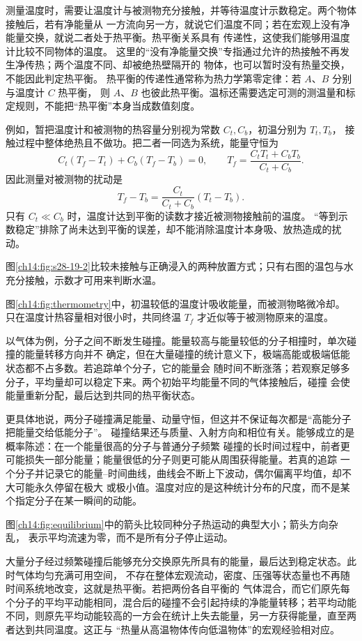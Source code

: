 {测量温度时，需要让温度计与被测物充分接触，并等待温度计示数稳定。两个物体接触后，若有净能量从
一方流向另一方，就说它们温度不同；若在宏观上没有净能量交换，就说二者处于热平衡。热平衡关系具有
传递性，这使我们能够用温度计比较不同物体的温度。
这里的“没有净能量交换”专指通过允许的热接触不再发生净传热；两个温度不同、却被绝热壁隔开的
物体，也可以暂时没有热量交换，不能因此判定热平衡。
热平衡的传递性通常称为热力学第零定律：若 $A$、$B$ 分别与温度计 $C$ 热平衡，
则 $A$、$B$ 也彼此热平衡。温标还需要选定可测的测温量和标定规则，不能把“热平衡”本身当成数值刻度。

例如，暂把温度计和被测物的热容量分别视为常数 $C_t,C_b$，初温分别为 $T_t,T_b$，
接触过程中整体绝热且不做功。把二者一同选为系统，能量守恒为
\[
 C_t(T_f-T_t)+C_b(T_f-T_b)=0,
 \qquad T_f=\frac{C_tT_t+C_bT_b}{C_t+C_b}.
\]
因此测量对被测物的扰动是
\[
 T_f-T_b=\frac{C_t}{C_t+C_b}(T_t-T_b).
\]
只有 $C_t\ll C_b$ 时，温度计达到平衡的读数才接近被测物接触前的温度。
“等到示数稳定”排除了尚未达到平衡的误差，却不能消除温度计本身吸、放热造成的扰动。

图\ref{ch14:fig:s28-19-2}比较未接触与正确浸入的两种放置方式；只有右图的温包与水充分接触，示数才可用来判断水温。
\figureNineteenTwoFaithful

图\ref{ch14:fig:thermometry}中，初温较低的温度计吸收能量，而被测物略微冷却。
只在温度计热容量相对很小时，共同终温 $T_f$ 才近似等于被测物原来的温度。
\thermometerMeasurementDiagram

以气体为例，分子之间不断发生碰撞。能量较高与能量较低的分子相撞时，单次碰撞的能量转移方向并不
确定，但在大量碰撞的统计意义下，极端高能或极端低能状态都不占多数。若追踪单个分子，它的能量会
随时间不断涨落；若观察足够多分子，平均量却可以稳定下来。两个初始平均能量不同的气体接触后，碰撞
会使能量重新分配，最后达到共同的热平衡状态。

更具体地说，两分子碰撞满足能量、动量守恒，但这并不保证每次都是“高能分子把能量交给低能分子”。
碰撞结果还与质量、入射方向和相位有关。能够成立的是概率陈述：在一个能量很高的分子与普通分子频繁
碰撞的长时间过程中，前者更可能损失一部分能量；能量很低的分子则更可能从周围获得能量。若真的追踪
一个分子并记录它的能量--时间曲线，曲线会不断上下波动，偶尔偏离平均值，却不大可能永久停留在极大
或极小值。温度对应的是这种统计分布的尺度，而不是某个指定分子在某一瞬间的动能。

图\ref{ch14:fig:equilibrium}中的箭头比较同种分子热运动的典型大小；箭头方向杂乱，
表示平均流速为零，而不是所有分子停止运动。
\molecularEquilibriumDiagram

大量分子经过频繁碰撞后能够充分交换原先所具有的能量，最后达到稳定状态。此时气体均匀充满可用空间，
不存在整体宏观流动，密度、压强等状态量也不再随时间系统地改变，这就是热平衡。若把两份各自平衡的
气体混合，而它们原先每个分子的平均平动能相同，混合后的碰撞不会引起持续的净能量转移；若平均动能
不同，则原先平均动能较高的一方会在统计上失去能量，另一方获得能量，直至两者达到共同温度。这正与
“热量从高温物体传向低温物体”的宏观经验相对应。

}
